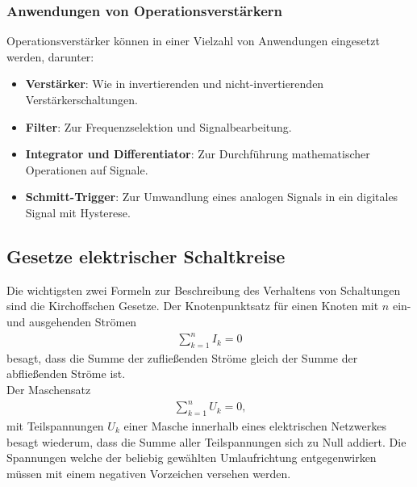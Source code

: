 \documentclass[12pt]{article}
\begin{document}
\subsubsection{Anwendungen von Operationsverstärkern}
Operationsverstärker können in einer Vielzahl von Anwendungen eingesetzt werden, darunter:
\begin{itemize}
    \item \textbf{Verstärker}: Wie in invertierenden und nicht-invertierenden Verstärkerschaltungen.
    \item \textbf{Filter}: Zur Frequenzselektion und Signalbearbeitung.
    \item \textbf{Integrator und Differentiator}: Zur Durchführung mathematischer Operationen auf Signale.
    \item \textbf{Schmitt-Trigger}: Zur Umwandlung eines analogen Signals in ein digitales Signal mit Hysterese.
\end{itemize}
\subsection{Gesetze elektrischer Schaltkreise}
Die wichtigsten zwei Formeln zur Beschreibung des Verhaltens von Schaltungen sind die Kirchoffschen Gesetze\cite{kirchhoff1845durchgang}.
Der Knotenpunktsatz für einen Knoten mit $n$ ein- und ausgehenden Strömen
\begin{align}
  \sum_{k=1}^n I_k=0
\end{align}
besagt, dass die Summe der zufließenden Ströme gleich der Summe der abfließenden Ströme ist.\\
Der Maschensatz
\begin{align}
  \sum_{k=1}^nU_k=0\text{,}
\end{align}
mit Teilspannungen $U_k$ einer Masche innerhalb eines elektrischen Netzwerkes besagt wiederum, dass die Summe aller Teilspannungen sich zu Null addiert. Die Spannungen welche der beliebig gewählten Umlaufrichtung entgegenwirken müssen mit einem negativen Vorzeichen versehen werden.
\end{document}
